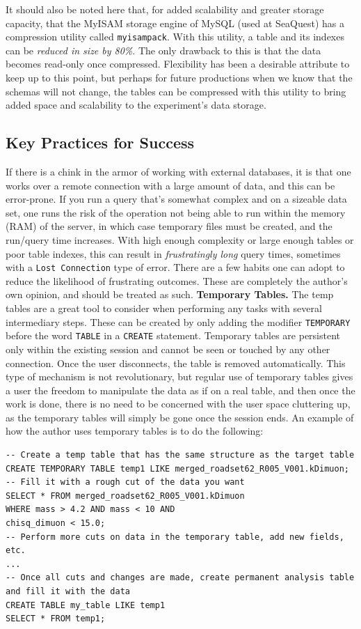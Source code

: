 It should also be noted here that, for added scalability and greater storage capacity, that the MyISAM storage engine of MySQL (used at SeaQuest) has a compression utility called \verb|myisampack|. With this utility, a table and its indexes can be \emph{reduced in size by 80\%}. The only drawback to this is that the data becomes read-only once compressed. Flexibility has been a desirable attribute to keep up to this point, but perhaps for future productions when we know that the schemas will not change, the tables can be compressed with this utility to bring added space and scalability to the experiment's data storage.

\subsection{Key Practices for Success}

If there is a chink in the armor of working with external databases, it is that one works over a remote connection with a large amount of data, and this can be error-prone. If you run a query that's somewhat complex and on a sizeable data set, one runs the risk of the operation not being able to run within the memory (RAM) of the server, in which case temporary files must be created, and the run/query time increases. With high enough complexity or large enough tables or poor table indexes, this can result in \emph{frustratingly long} query times, sometimes with a \verb|Lost Connection| type of error. There are a few habits one can adopt to reduce the likelihood of frustrating outcomes. These are completely the author's own opinion, and should be treated as such.
\newline\newline
\textbf{Temporary Tables.} The temp tables are a great tool to consider when performing any tasks with several intermediary steps. These can be created by only adding the modifier \verb|TEMPORARY| before the word \verb|TABLE| in a \verb|CREATE| statement. Temporary tables are persistent only within the existing session and cannot be seen or touched by any other connection. Once the user disconnects, the table is removed automatically. This type of mechanism is not revolutionary, but regular use of temporary tables gives a user the freedom to manipulate the data as if on a real table, and then once the work is done, there is no need to be concerned with the user space cluttering up, as the temporary tables will simply be gone once the session ends. An example of how the author uses temporary tables is to do the following:
\begin{lstlisting}
-- Create a temp table that has the same structure as the target table
CREATE TEMPORARY TABLE temp1 LIKE merged_roadset62_R005_V001.kDimuon;
-- Fill it with a rough cut of the data you want
SELECT * FROM merged_roadset62_R005_V001.kDimuon 
WHERE mass > 4.2 AND mass < 10 AND
chisq_dimuon < 15.0;
-- Perform more cuts on data in the temporary table, add new fields, etc. 
...
-- Once all cuts and changes are made, create permanent analysis table and fill it with the data
CREATE TABLE my_table LIKE temp1
SELECT * FROM temp1;
\end{lstlisting}

